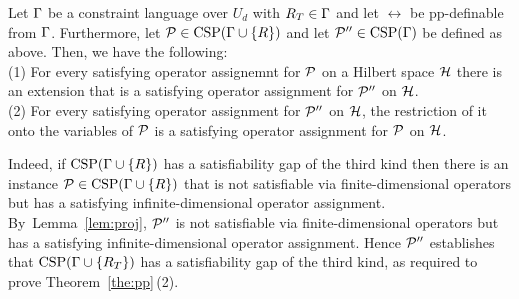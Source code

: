 \begin{lemma}\label{lem:proj}
  Let $\Gamma$ be a constraint language over $U_d$ with $R_T\in\Gamma$ and let $\rel$ be pp-definable
  from $\Gamma$. Furthermore, let ${\mathcal P}\in{\rm CSP}(\Gamma\cup\{R\})$ and let
  ${\mathcal P}''\in{\rm CSP}(\Gamma)$ be defined as above.  Then, we have the following:\\[2mm]
  (1) For every satisfying operator assignemnt for ${\mathcal P}$ on a Hilbert
  space ${\mathcal H}$ there is an extension that is a satisfying operator
  assignment for ${\mathcal P}''$ on ${\mathcal H}$.\\[2mm]
  (2) For every satisfying operator assignment for ${\mathcal P}''$ on ${\mathcal H}$, the
  restriction of it onto the variables of ${\mathcal P}$ is a satisfying operator
  assignment for ${\mathcal P}$ on ${\mathcal H}$.
\end{lemma}
%
Indeed, if ${\rm CSP}(\Gamma\cup\{R\})$ has a satisfiability gap of the
third kind then there is an instance ${\mathcal P}\in{\rm CSP}(\Gamma\cup\{R\})$ that is not
satisfiable via finite-dimensional operators but has a satisfying
infinite-dimensional operator assignment. By~Lemma~\ref{lem:proj}, ${\mathcal P}''$ is
not satisfiable via finite-dimensional operators but has a satisfying
infinite-dimensional operator assignment. Hence ${\mathcal P}''$ establishes that
${\rm CSP}(\Gamma\cup\{R_T\})$ has a satisfiability gap of the third kind, as required to prove Theorem~\ref{the:pp}\,(2).
%
